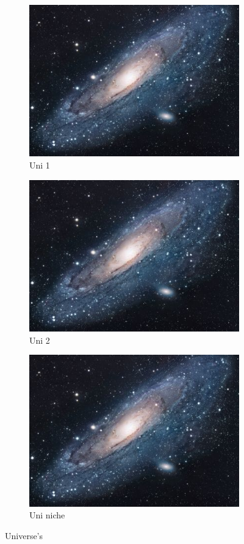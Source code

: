\documentclass[18pt,a4paper]{article}
\begin{document}
\begin{figure}[h!]
	\centering
	\begin{subfigure}[t]{0.4\linewidth}
		
		\includegraphics{universe.jpg}
		\caption{Uni 1}	
	\end{subfigure}
	\begin{subfigure}[t]{0.4\linewidth}
		\includegraphics{universe.jpg}
		\caption{Uni 2}
	\end{subfigure}
	\begin{subfigure}[b]{\linewidth}
		\centering
		\includegraphics[width =\linewidth]{universe.jpg}
		\caption{Uni niche}
	\end{subfigure}
	\caption{Universe's}
	\label{fig:universe}
\end{figure}
\newpage
\end{document}
